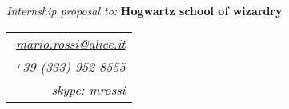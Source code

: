 \documentclass{scrartcl}
\begin{document}
\thispagestyle{empty} %

\begin{minipage}[t]{0.8\textwidth}

\begin{cv}{\LARGE{}}\vspace{1em} %
	\textit{Internship proposal to:} \textbf{Hogwartz school of wizardry}
\end{cv}
\end{minipage}
\hfill
\begin{minipage}[t]{0.2\textwidth}

\begin{tabular}{ r }
\small \textit{ \href{mailto:mario.rossi@alice.it}{mario.rossi@alice.it} }\\ 
\small \textit{+39 (333) 952 8555} \\ 
\small \textit{skype: mrossi}
   
\end{tabular}
\end{minipage}
\end{document}
